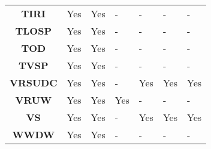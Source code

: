 \begin{table}[ht!]
\begin{tabular}{cllllll}
\textbf{TIRI}        & Yes                                 & Yes                                 & -                                       & -                                        & -                                         & -                                         \\
\textbf{TLOSP}       & Yes                                 & Yes                                 & -                                       & -                                        & -                                         & -                                         \\
\textbf{TOD}         & Yes                                 & Yes                                 & -                                       & -                                        & -                                         & -                                         \\
\textbf{TVSP}        & Yes                                 & Yes                                 & -                                       & -                                        & -                                         & -                                         \\
\textbf{VRSUDC}      & Yes                                 & Yes                                 & -                                       & Yes                                      & Yes                                       & Yes                                       \\
\textbf{VRUW}        & Yes                                 & Yes                                 & Yes                                     & -                                        & -                                         & -                                         \\
\textbf{VS}          & Yes                                 & Yes                                 & -                                       & Yes                                      & Yes                                       & Yes                                       \\
\textbf{WWDW}        & Yes                                 & Yes                                 & -                                       & -                                        & -                                         & -                                        
\end{tabular}
\end{table}

